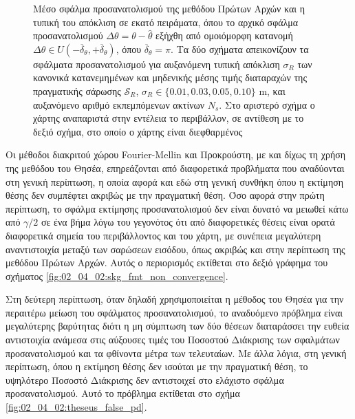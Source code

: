 \begin{figure}[!h]\centering
  \vspace{2cm}
  
  \vspace{1cm}
  \caption{\small Μέσο σφάλμα προσανατολισμού της μεθόδου Πρώτων Αρχών και η
           τυπική του απόκλιση σε εκατό πειράματα, όπου το αρχικό σφάλμα
           προσανατολισμού $\Delta \theta = \theta-\hat{\theta}$ εξήχθη από
           ομοιόμορφη κατανομή $\Delta \theta \in
           U(-\overline{\delta}_{\theta}, +\overline{\delta}_{\theta})$, όπου
           $\overline{\delta}_{\theta} = \pi$. Τα δύο σχήματα απεικονίζουν τα
           σφάλματα προσανατολισμού για αυξανόμενη τυπική απόκλιση $\sigma_R$
           των κανονικά κατανεμημένων και μηδενικής μέσης τιμής διαταραχών της
           πραγματικής σάρωσης
           $\mathcal{S}_R$, $\sigma_R \in \{0.01,0.03,0.05,0.10\}$ m, και
           αυξανόμενο αριθμό εκπεμπόμενων ακτίνων $N_s$. Στο αριστερό σχήμα ο
           χάρτης αναπαριστά στην εντέλεια το περιβάλλον, σε αντίθεση με το
           δεξιό σχήμα, στο οποίο ο χάρτης είναι διεφθαρμένος}
  \label{fig:02_04_02:errorbar_x1}
\end{figure}

Οι μέθοδοι διακριτού χώρου Fourier-Mellin και Προκρούστη, με και δίχως τη χρήση
της μεθόδου του Θησέα, επηρεάζονται από διαφορετικά προβλήματα που αναδύονται
στη γενική περίπτωση, η οποία αφορά και εδώ στη γενική συνθήκη όπου η εκτίμηση
θέσης δεν συμπέφτει ακριβώς με την πραγματική θέση. Όσο αφορά στην πρώτη
περίπτωση, το σφάλμα εκτίμησης προσανατολισμού δεν είναι δυνατό να μειωθεί κάτω
από $\gamma/2$ σε ένα βήμα λόγω του γεγονότος ότι από διαφορετικές θέσεις είναι
ορατά διαφορετικά σημεία του περιβάλλοντος και του χάρτη, με συνέπεια
μεγαλύτερη αναντιστοιχία μεταξύ των σαρώσεων εισόδου, όπως ακριβώς και στην
περίπτωση της μεθόδου Πρώτων Αρχών. Αυτός ο περιορισμός εκτίθεται στο δεξιό
γράφημα του σχήματος \ref{fig:02_04_02:skg_fmt_non_convergence}.

Στη δεύτερη περίπτωση, όταν δηλαδή χρησιμοποιείται η μέθοδος του Θησέα για την
περαιτέρω μείωση του σφάλματος προσανατολισμού, το αναδυόμενο πρόβλημα είναι
μεγαλύτερης βαρύτητας διότι η μη σύμπτωση των δύο θέσεων διαταράσσει την ευθεία
αντιστοιχία ανάμεσα στις αύξουσες τιμές του Ποσοστού Διάκρισης των σφαλμάτων
προσανατολισμού και τα φθίνοντα μέτρα των τελευταίων. Με άλλα λόγια, στη γενική
περίπτωση, όπου η εκτίμηση θέσης δεν ισούται με την πραγματική θέση, το
υψηλότερο Ποσοστό Διάκρισης δεν αντιστοιχεί στο ελάχιστο σφάλμα
προσανατολισμού. Αυτό το πρόβλημα εκτίθεται στο σχήμα
\ref{fig:02_04_02:theseus_false_pd}.

